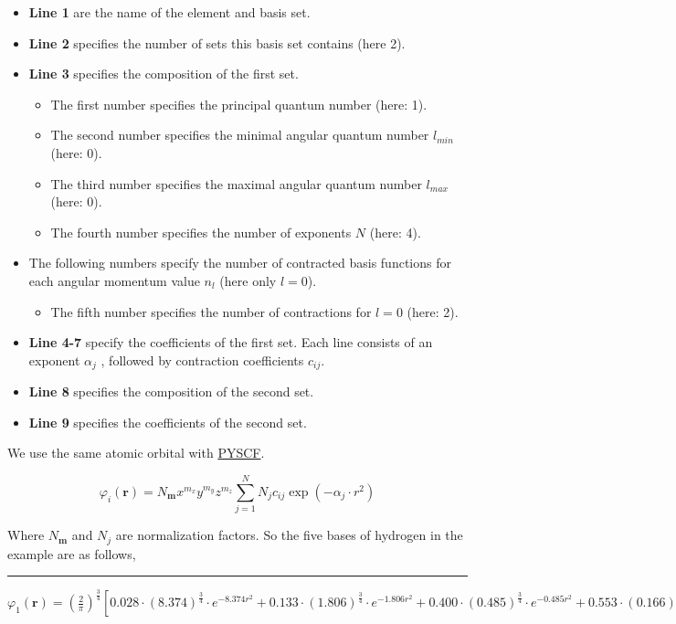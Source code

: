 \documentclass{article}
\begin{document}
        \begin{itemize}
            \item[] \textbf{Line 1} are the name of the element and basis set.
            \item[] \textbf{Line 2} specifies the number of sets this basis set contains (here 2).
            \item[] \textbf{Line 3} specifies the composition of the first set.
            \begin{itemize}
                \item[] The first number specifies the principal quantum number (here: 1).
                \item[] The second number specifies the minimal angular quantum number $l_{min}$ (here: 0).
                \item[] The third number specifies the maximal angular quantum number $l_{max}$ (here: 0).
                \item[] The fourth number specifies the number of exponents $N$ (here: 4).
            \end{itemize}
            \item[] The following numbers specify the number of contracted basis functions for each angular momentum value $n_l$ (here only $l=0$).
            \begin{itemize}
                \item[] The fifth number specifies the number of contractions for $l=0$ (here: 2).
            \end{itemize}
            \item[] \textbf{Line 4-7} specify the coefficients of the first set. Each line consists of an exponent $\alpha_j$
            , followed by contraction coefficients $c_{ij}$.
            \item[] \textbf{Line 8} specifies the composition of the second set.
            \item[] \textbf{Line 9} specifies the coefficients of the second set.
        \end{itemize}

        We use the same atomic orbital with \href{https://pyscf.org/}{PYSCF}.

        \begin{equation}
            \varphi_i(\textbf{r}) = N_{\textbf{m}}x^{m_x}y^{m_y}z^{m_z}\sum_{j=1}^NN_{j}c_{ij}\exp\left(-\alpha_{j}\cdot r^2\right)
        \end{equation}

        Where $N_{\textbf{m}}$ and $N_{j}$ are normalization factors.
        So the five bases of hydrogen in the example are as follows,
        ~\\
        \hrule
        $ \varphi_1(\textbf{r}) = \left(\frac{2}{\pi}\right)^{\frac{3}{4}}\left[
            0.028\cdot(8.374)^{\frac{3}{4}}\cdot e^{-8.374r^2}+
            0.133\cdot(1.806)^{\frac{3}{4}}\cdot e^{-1.806r^2}+
            0.400\cdot(0.485)^{\frac{3}{4}}\cdot e^{-0.485r^2}+
            0.553\cdot(0.166)^{\frac{3}{4}}\cdot e^{-0.166r^2}\right] $
 
\end{document}
